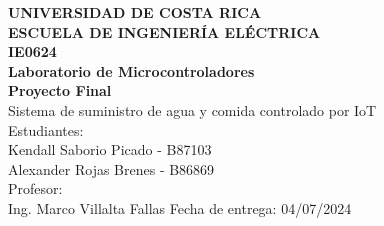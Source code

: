 \documentclass[12pt,letterpaper]{article}
\begin{document}
\begin{titlepage}
\begin{center}
\textbf{UNIVERSIDAD DE COSTA RICA}\\ 
\vspace{6mm}
\textbf{ESCUELA DE INGENIERÍA ELÉCTRICA}\\
\vspace{3cm}
\textbf{IE0624}\\
\textbf{Laboratorio de Microcontroladores}\\
\vspace{3cm}
\textbf{Proyecto Final}\\
\vspace{0.5cm}
Sistema de suministro de agua y comida controlado por IoT\\
\vspace{3cm}
Estudiantes:\\
Kendall Saborio Picado - B87103\\
Alexander Rojas Brenes - B86869\\
\vspace{1.5cm}
Profesor:\\
Ing. Marco Villalta Fallas
\vfill
Fecha de entrega: 04/07/2024
\end{center}
\end{titlepage}

\tableofcontents












\end{document}

